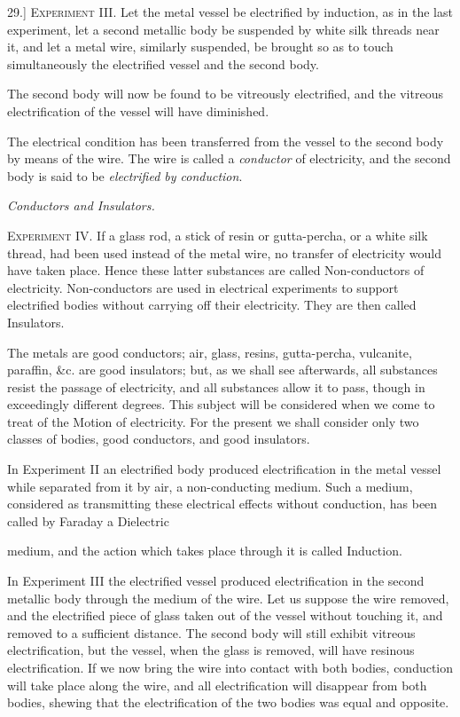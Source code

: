 \documentclass[11pt,a4paper]{article}
\begin{document}
29.] \textsc{Experiment III.} Let the metal vessel be electrified by
induction, as in the last experiment, let a second metallic body be
suspended by white silk threads near it, and let a metal wire, similarly
suspended, be brought so as to touch simultaneously the electrified
vessel and the second body.

The second body will now be found to be vitreously electrified, and the
vitreous electrification of the vessel will have diminished.

The electrical condition has been transferred from the vessel to the
second body by means of the wire. The wire is called a
\textit{conductor} of electricity, and the second body is said to be
\textit{electrified by conduction}.

\begin{center}
\textit{Conductors and Insulators.}
\end{center}

\textsc{Experiment IV.} If a glass rod, a stick of resin or
gutta-percha, or a white silk thread, had been used instead of the metal
wire, no transfer of electricity would have taken place. Hence these
latter substances are called Non-conductors of electricity.
Non-conductors are used in electrical experiments to support electrified
bodies without carrying off their electricity. They are then called
Insulators.

The metals are good conductors; air, glass, resins, gutta-percha,
vulcanite, paraffin, \&c. are good insulators; but, as we shall see
afterwards, all substances resist the passage of electricity, and all
substances allow it to pass, though in exceedingly different degrees.
This subject will be considered when we come to treat of the Motion of
electricity. For the present we shall consider only two classes of
bodies, good conductors, and good insulators.

In Experiment II an electrified body produced electrification in the
metal vessel while separated from it by air, a non-conducting medium.
Such a medium, considered as transmitting these electrical effects
without conduction, has been called by Faraday a Dielectric

\clearpage
\setcounter{footnote}{0}

medium, and the action which takes place through it is called
Induction.

In Experiment III the electrified vessel produced electrification in
the second metallic body through the medium of the wire. Let us suppose
the wire removed, and the electrified piece of glass taken out of the
vessel without touching it, and removed to a sufficient distance. The
second body will still exhibit vitreous electrification, but the vessel,
when the glass is removed, will have resinous electrification. If we now
bring the wire into contact with both bodies, conduction will take place
along the wire, and all electrification will disappear from both bodies,
shewing that the electrification of the two bodies was equal and
opposite.
\end{document}
